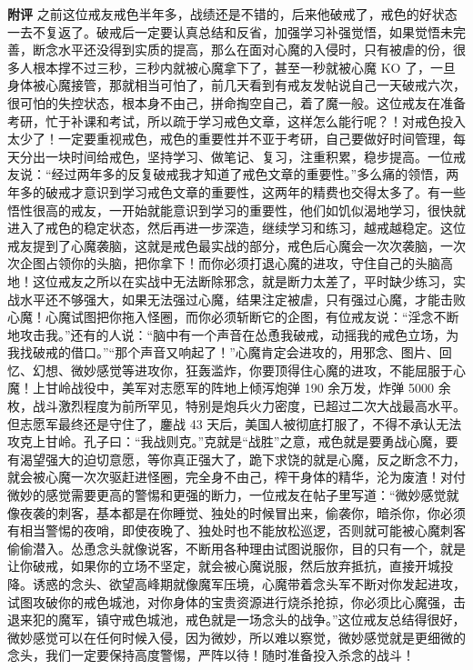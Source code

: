 \begin{case}
    \textbf{附评} 之前这位戒友戒色半年多，战绩还是不错的，后来他破戒了，戒色的好状态一去不复返了。破戒后一定要认真总结和反省，加强学习补强觉悟，如果觉悟未完善，断念水平还没得到实质的提高，那么在面对心魔的入侵时，只有被虐的份，很多人根本撑不过三秒，三秒内就被心魔拿下了，甚至一秒就被心魔 KO 了，一旦身体被心魔接管，那就相当可怕了，前几天看到有戒友发帖说自己一天破戒六次，很可怕的失控状态，根本身不由己，拼命掏空自己，着了魔一般。这位戒友在准备考研，忙于补课和考试，所以疏于学习戒色文章，这样怎么能行呢？！对戒色投入太少了！一定要重视戒色，戒色的重要性并不亚于考研，自己要做好时间管理，每天分出一块时间给戒色，坚持学习、做笔记、复习，注重积累，稳步提高。一位戒友说：“经过两年多的反复破戒我才知道了戒色文章的重要性。”多么痛的领悟，两年多的破戒才意识到学习戒色文章的重要性，这两年的精费也交得太多了。有一些悟性很高的戒友，一开始就能意识到学习的重要性，他们如饥似渴地学习，很快就进入了戒色的稳定状态，然后再进一步深造，继续学习和练习，越戒越稳定。这位戒友提到了心魔袭脑，这就是戒色最实战的部分，戒色后心魔会一次次袭脑，一次次企图占领你的头脑，把你拿下！而你必须打退心魔的进攻，守住自己的头脑高地！这位戒友之所以在实战中无法断除邪念，就是断力太差了，平时缺少练习，实战水平还不够强大，如果无法强过心魔，结果注定被虐，只有强过心魔，才能击败心魔！心魔试图把你拖入怪圈，而你必须斩断它的企图，有位戒友说：“淫念不断地攻击我。”还有的人说：“脑中有一个声音在怂恿我破戒，动摇我的戒色立场，为我找破戒的借口。”“那个声音又响起了！”心魔肯定会进攻的，用邪念、图片、回忆、幻想、微妙感觉等进攻你，狂轰滥炸，你要顶得住心魔的进攻，不能屈服于心魔！上甘岭战役中，美军对志愿军的阵地上倾泻炮弹 190 余万发，炸弹 5000 余枚，战斗激烈程度为前所罕见，特别是炮兵火力密度，已超过二次大战最高水平。但志愿军最终还是守住了，鏖战 43 天后，美国人被彻底打服了，不得不承认无法攻克上甘岭。孔子曰：“我战则克。”克就是“战胜”之意，戒色就是要勇战心魔，要有渴望强大的迫切意愿，等你真正强大了，跪下求饶的就是心魔，反之断念不力，就会被心魔一次次驱赶进怪圈，完全身不由己，榨干身体的精华，沦为废渣！对付微妙的感觉需要更高的警惕和更强的断力，一位戒友在帖子里写道：“微妙感觉就像夜袭的刺客，基本都是在你睡觉、独处的时候冒出来，偷袭你，暗杀你，你必须有相当警惕的夜哨，即使夜晚了、独处时也不能放松巡逻，否则就可能被心魔刺客偷偷潜入。怂恿念头就像说客，不断用各种理由试图说服你，目的只有一个，就是让你破戒，如果你的立场不坚定，就会被心魔说服，然后放弃抵抗，直接开城投降。诱惑的念头、欲望高峰期就像魔军压境，心魔带着念头军不断对你发起进攻，试图攻破你的戒色城池，对你身体的宝贵资源进行烧杀抢掠，你必须比心魔强，击退来犯的魔军，镇守戒色城池，戒色就是一场念头的战争。”这位戒友总结得很好，微妙感觉可以在任何时候入侵，因为微妙，所以难以察觉，微妙感觉就是更细微的念头，我们一定要保持高度警惕，严阵以待！随时准备投入杀念的战斗！
\end{case}

